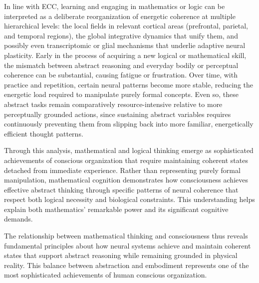 In line with ECC, learning and engaging in mathematics or logic can be interpreted as a deliberate reorganization of energetic coherence at multiple hierarchical levels: the local fields in relevant cortical areas (prefrontal, parietal, and temporal regions), the global integrative dynamics that unify them, and possibly even transcriptomic or glial mechanisms that underlie adaptive neural plasticity. Early in the process of acquiring a new logical or mathematical skill, the mismatch between abstract reasoning and everyday bodily or perceptual coherence can be substantial, causing fatigue or frustration. Over time, with practice and repetition, certain neural patterns become more stable, reducing the energetic load required to manipulate purely formal concepts. Even so, these abstract tasks remain comparatively resource-intensive relative to more perceptually grounded actions, since sustaining abstract variables requires continuously preventing them from slipping back into more familiar, energetically efficient thought patterns.

Through this analysis, mathematical and logical thinking emerge as sophisticated achievements of conscious organization that require maintaining coherent states detached from immediate experience. Rather than representing purely formal manipulation, mathematical cognition demonstrates how consciousness achieves effective abstract thinking through specific patterns of neural coherence that respect both logical necessity and biological constraints. This understanding helps explain both mathematics' remarkable power and its significant cognitive demands.

The relationship between mathematical thinking and consciousness thus reveals fundamental principles about how neural systems achieve and maintain coherent states that support abstract reasoning while remaining grounded in physical reality. This balance between abstraction and embodiment represents one of the most sophisticated achievements of human conscious organization.